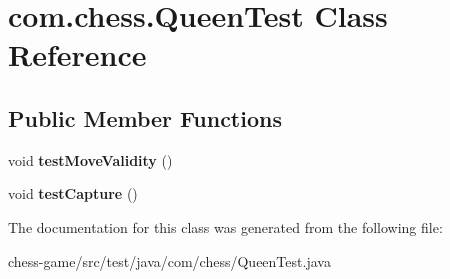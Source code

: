 \hypertarget{classcom_1_1chess_1_1_queen_test}{}\section{com.\+chess.\+Queen\+Test Class Reference}
\label{classcom_1_1chess_1_1_queen_test}
\subsection*{Public Member Functions}
\begin{DoxyCompactItemize}
\item 
\mbox{\label{classcom_1_1chess_1_1_queen_test_a2331cc3ec7d950240c84fb2224a65bc3}} 
void {\bfseries test\+Move\+Validity} ()
\item 
\mbox{\label{classcom_1_1chess_1_1_queen_test_a4bfde6b8d62e458daa96f8b5232ec70a}} 
void {\bfseries test\+Capture} ()
\end{DoxyCompactItemize}


The documentation for this class was generated from the following file\+:\begin{DoxyCompactItemize}
\item 
chess-\/game/src/test/java/com/chess/Queen\+Test.\+java\end{DoxyCompactItemize}

